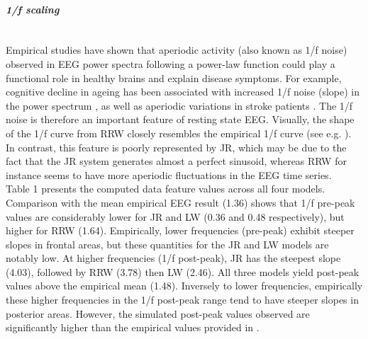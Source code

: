 \documentclass[12pt,twoside]{article}
\begin{document}
\paragraph{\textit{1/f scaling}} ~\\
Empirical studies have shown that aperiodic activity (also known as 1/f noise) observed in EEG power spectra following a power-law function could play a functional role in healthy brains and explain disease symptoms. For example, cognitive decline in ageing has been associated with increased 1/f noise (slope) in the power spectrum \citep{voytek2015age}, as well as aperiodic variations in stroke patients \citep{johnston2023spectral}.
The 1/f noise is therefore an important feature of resting state EEG. Visually, the shape of the 1/f curve from RRW closely resembles the empirical 1/f curve (see e.g. \citealp{freeman2003spatial, dehghani2010comparative}). In contrast, this feature is poorly represented by JR, which may be due to the fact that the JR system generates almost a perfect sinusoid, whereas RRW for instance seems to have more aperiodic fluctuations in the EEG time series.\\
Table 1 presents the computed data feature values across all four models. Comparison with the mean empirical EEG result (1.36) shows that 1/f pre-peak values are considerably lower for JR and LW (0.36 and 0.48 respectively), but higher for RRW (1.64). Empirically, lower frequencies (pre-peak) exhibit steeper slopes in frontal areas, but these quantities for the JR and LW models are notably low.
At higher frequencies (1/f post-peak), JR has the steepest slope (4.03), followed by RRW (3.78) then LW (2.46). All three models yield post-peak values above the empirical mean (1.48). Inversely to lower frequencies, empirically these higher frequencies in the 1/f post-peak range tend to have steeper slopes in posterior areas. However, the simulated post-peak values observed are significantly higher than the empirical values provided in \citet{muthukumaraswamy20181}.
\end{document}
